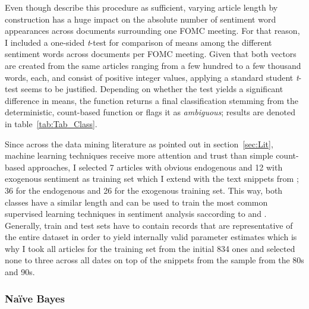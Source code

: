 Even though \textcite{Meyer.2008} describe this procedure as sufficient, varying article length by construction has a huge impact on the absolute number of sentiment word appearances across documents surrounding one FOMC meeting. For that reason, I included a one-sided \textit{t}-test for comparison of means among the different sentiment words across documents per FOMC meeting. Given that both vectors are created from the same articles ranging from a few hundred to a few thousand words, each, and consist of positive integer values, applying a standard student \textit{t}-test seems to be justified. Depending on whether the test yields a significant difference in means, the function returns a final classification stemming from the deterministic, count-based function or flags it as \textit{ambiguous}; results are denoted in table~\vref{tab:Tab_Class}.

Since across the data mining literature as pointed out in section~\ref{sec:Lit}, machine learning techniques receive more attention and trust than simple count-based approaches, I selected 7 articles with obvious endogenous and 12 with exogenous sentiment as training set which I extend with the text snippets from \textcite{Ellingsen.2003}; 36 for the endogenous and 26 for the exogenous training set. This way, both classes have a similar length and can be used to train the most common supervised learning techniques in sentiment analysis saccording to \textcite{Liu.2010} and \textcite{Feldman.2013}. Generally, train and test sets have to contain records that are representative of the entire dataset in order to yield internally valid parameter estimates which is why I took all articles for the training set from the initial 834 ones and selected none to three across all dates on top of the snippets from the \textcite{Ellingsen.2003} sample from the 80s and 90s.

\subsubsection{Na\"{i}ve Bayes} %

